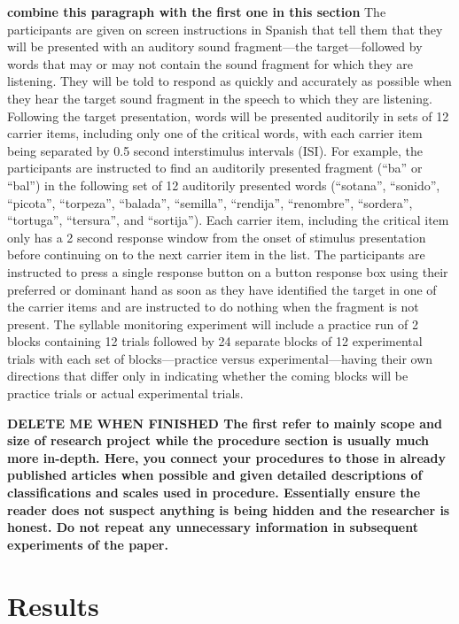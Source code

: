 \textbf{combine this paragraph with the first one in this section}
The participants are given on screen instructions in Spanish that tell them that they will be presented with an auditory sound fragment—the target—followed by words that may or may not contain the sound fragment for which they are listening. They will be told to respond as quickly and accurately as possible when they hear the target sound fragment in the speech to which they are listening. Following the target presentation, words will be presented auditorily in sets of 12 carrier items, including only one of the critical words, with each carrier item being separated by 0.5 second interstimulus intervals (ISI). For example, the participants are instructed to find an auditorily presented fragment (“ba” or “bal”) in the following set of 12 auditorily presented words (“sotana”, “sonido”, “picota”, “torpeza”, “balada”, “semilla”, “rendija”, “renombre”, “sordera”, “tortuga”, “tersura”, and “sortija”). Each carrier item, including the critical item only has a 2 second response window from the onset of stimulus presentation before continuing on to the next carrier item in the list. The participants are instructed to press a single response button on a button response box using their preferred or dominant hand as soon as they have identified the target in one of the carrier items and are instructed to do nothing when the fragment is not present. The syllable monitoring experiment will include a practice run of 2 blocks containing 12 trials followed by 24 separate blocks of 12 experimental trials with each set of blocks—practice versus experimental—having their own directions that differ only in indicating whether the coming blocks will be practice trials or actual experimental trials.

\textbf{DELETE ME WHEN FINISHED
The first refer to mainly scope and size of research project while the procedure section is usually much more in-depth. Here, you connect your procedures to those in already published articles when possible and given detailed descriptions of classifications and scales used in procedure. Essentially ensure the reader does not suspect anything is being hidden and the researcher is honest. Do not repeat any unnecessary information in subsequent experiments of the paper.}



\section{Results}

